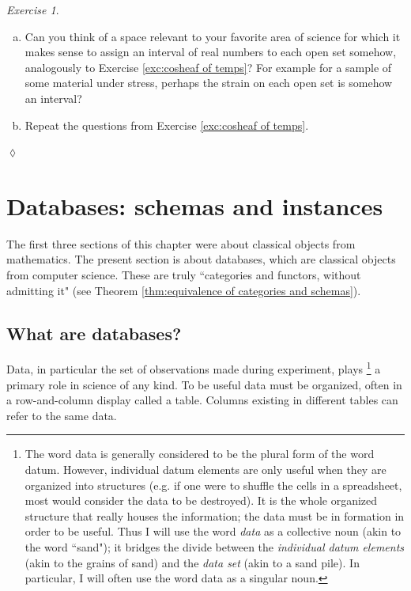 \documentclass{book}
\theoremstyle{remark}
\newtheorem{exc}[subsubsection]{Exercise}
\newenvironment{exercise}{\begin{exc}}{\hspace*{\fill}$\lozenge$\end{exc}}
\theoremstyle{definition}
\def\sexc{\begin{enumerate}[a.)]\setlength{\itemsep}{.1cm}\setlength{\parskip}{.1cm}\item}
\def\next{\item}
\def\endsexc{\end{enumerate}}
\begin{document}
\begin{exercise}~
\sexc Can you think of a space relevant to your favorite area of science for which it makes sense to assign an interval of real numbers to each open set somehow, analogously to Exercise \ref{exc:cosheaf of temps}? For example for a sample of some material under stress, perhaps the strain on each open set is somehow an interval? 
\next Repeat the questions from Exercise \ref{exc:cosheaf of temps}.
\endsexc
\end{exercise}


\section{Databases: schemas and instances}\label{sec:databases}

The first three sections of this chapter were about classical objects from mathematics. The present section is about databases, which are classical objects from computer science. These are truly ``categories and functors, without admitting it" (see Theorem \ref{thm:equivalence of categories and schemas}).


\subsection{What are databases?}\label{sec:what are dbs}

Data, in particular the set of observations made during experiment, plays
\footnote{The word data is generally considered to be the plural form of the word datum. However, individual datum elements are only useful when they are organized into structures (e.g. if one were to shuffle the cells in a spreadsheet, most would consider the data to be destroyed). It is the whole organized structure that really houses the information; the data must be in formation in order to be useful. Thus I will use the word {\em data} as a collective noun (akin to the word ``sand"); it bridges the divide between the {\em individual datum elements} (akin to the grains of sand) and the {\em data set} (akin to a sand pile). In particular, I will often use the word data as a singular noun.}
a primary role in science of any kind. To be useful data must be organized, often in a row-and-column display called a table. Columns existing in different tables can refer to the same data.
\end{document}
